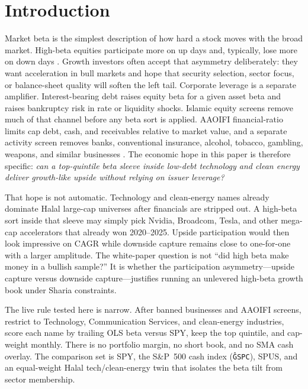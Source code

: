 \documentclass[11pt,letterpaper]{article}
\begin{document}
\section{Introduction}

Market beta is the simplest description of how hard a stock moves with the broad market. High-beta equities participate more on up days and, typically, lose more on down days \citep{fama1992,black1972}. Growth investors often accept that asymmetry deliberately: they want acceleration in bull markets and hope that security selection, sector focus, or balance-sheet quality will soften the left tail. Corporate leverage is a separate amplifier. Interest-bearing debt raises equity beta for a given asset beta and raises bankruptcy risk in rate or liquidity shocks. Islamic equity screens remove much of that channel before any beta sort is applied. AAOIFI financial-ratio limits cap debt, cash, and receivables relative to market value, and a separate activity screen removes banks, conventional insurance, alcohol, tobacco, gambling, weapons, and similar businesses \citep{aaoifi21,derigs2008}. The economic hope in this paper is therefore specific: \emph{can a top-quintile beta sleeve inside low-debt technology and clean energy deliver growth-like upside without relying on issuer leverage?}

That hope is not automatic. Technology and clean-energy names already dominate Halal large-cap universes after financials are stripped out. A high-beta sort inside that sleeve may simply pick Nvidia, Broadcom, Tesla, and other mega-cap accelerators that already won 2020--2025. Upside participation would then look impressive on CAGR while downside capture remains close to one-for-one with a larger amplitude. The white-paper question is not ``did high beta make money in a bullish sample?'' It is whether the participation asymmetry---upside capture versus downside capture---justifies running an unlevered high-beta growth book under Sharia constraints.

The live rule tested here is narrow. After banned businesses and AAOIFI screens, restrict to Technology, Communication Services, and clean-energy industries, score each name by trailing OLS beta versus SPY, keep the top quintile, and cap-weight monthly. There is no portfolio margin, no short book, and no SMA cash overlay. The comparison set is SPY, the S\&P~500 cash index (\texttt{\^GSPC}), SPUS, and an equal-weight Halal tech/clean-energy twin that isolates the beta tilt from sector membership.
\end{document}
